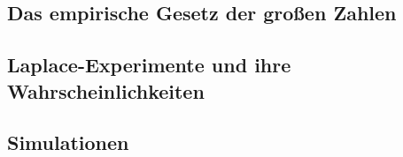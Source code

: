 \documentclass[
  ngerman,
]{book}
\begin{document}
\hypertarget{das-empirische-gesetz-der-grouxdfen-zahlen}{%
\subsection*{Das empirische Gesetz der großen Zahlen}\label{das-empirische-gesetz-der-grouxdfen-zahlen}}

\hypertarget{laplace-experimente-und-ihre-wahrscheinlichkeiten}{%
\subsection*{Laplace-Experimente und ihre Wahrscheinlichkeiten}\label{laplace-experimente-und-ihre-wahrscheinlichkeiten}}

\hypertarget{simulationen}{%
\subsection*{Simulationen}\label{simulationen}}

  
\end{document}
